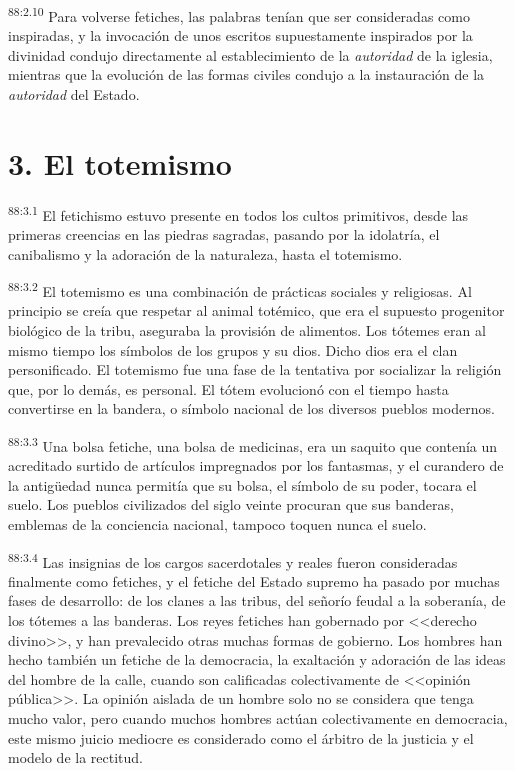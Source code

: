 \documentclass[twoside, 11pt]{book}
\begin{document}
\par
\textsuperscript{88:2.10} Para volverse fetiches, las palabras tenían que ser consideradas como inspiradas, y la invocación de unos escritos supuestamente inspirados por la divinidad condujo directamente al establecimiento de la \textit{autoridad} de la iglesia, mientras que la evolución de las formas civiles condujo a la instauración de la \textit{autoridad} del Estado.

\section*{3. El totemismo}
\par
\textsuperscript{88:3.1} El fetichismo estuvo presente en todos los cultos primitivos, desde las primeras creencias en las piedras sagradas, pasando por la idolatría, el canibalismo y la adoración de la naturaleza, hasta el totemismo.

\par
\textsuperscript{88:3.2} El totemismo es una combinación de prácticas sociales y religiosas. Al principio se creía que respetar al animal totémico, que era el supuesto progenitor biológico de la tribu, aseguraba la provisión de alimentos. Los tótemes eran al mismo tiempo los símbolos de los grupos y su dios. Dicho dios era el clan personificado. El totemismo fue una fase de la tentativa por socializar la religión que, por lo demás, es personal. El tótem evolucionó con el tiempo hasta convertirse en la bandera, o símbolo nacional de los diversos pueblos modernos.

\par
\textsuperscript{88:3.3} Una bolsa fetiche, una bolsa de medicinas, era un saquito que contenía un acreditado surtido de artículos impregnados por los fantasmas, y el curandero de la antig\"uedad nunca permitía que su bolsa, el símbolo de su poder, tocara el suelo. Los pueblos civilizados del siglo veinte procuran que sus banderas, emblemas de la conciencia nacional, tampoco toquen nunca el suelo.

\par
\textsuperscript{88:3.4} Las insignias de los cargos sacerdotales y reales fueron consideradas finalmente como fetiches, y el fetiche del Estado supremo ha pasado por muchas fases de desarrollo: de los clanes a las tribus, del señorío feudal a la soberanía, de los tótemes a las banderas. Los reyes fetiches han gobernado por <<derecho divino>>, y han prevalecido otras muchas formas de gobierno. Los hombres han hecho también un fetiche de la democracia, la exaltación y adoración de las ideas del hombre de la calle, cuando son calificadas colectivamente de <<opinión pública>>. La opinión aislada de un hombre solo no se considera que tenga mucho valor, pero cuando muchos hombres actúan colectivamente en democracia, este mismo juicio mediocre es considerado como el árbitro de la justicia y el modelo de la rectitud.
\end{document}
